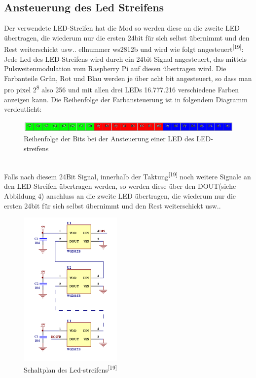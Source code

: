 \documentclass [a4paper, 11pt] {article}
\begin{document}
\subsection{Ansteuerung des Led Streifens}
Der verwendete LED-Streifen hat die Mod so werden diese an die zweite LED übertragen, die wiederum nur die ersten 24bit für sich selbst übernimmt und den Rest weiterschickt usw.. ellnummer ws2812b und wird wie folgt angesteuert\textsuperscript{[19]}:
Jede Led des LED-Streifens wird durch ein 24bit Signal angesteuert, das mittels Pulsweitenmodulation vom Raspberry Pi auf diesen übertragen wird. Die Farbanteile Grün, Rot und Blau werden je über acht bit angesteuert, so dass man pro pixel 2\textsuperscript 8 also 256 und mit allen drei LEDs 16.777.216 verschiedene Farben anzeigen kann. Die Reihenfolge der Farbansteuerung ist in folgendem Diagramm verdeutlicht:
\begin{figure}[h]
	\centering
	\includegraphics[width=17cm]{AufbauDer24BitAnsteuerungDesStreifens.png}
	\caption{Reihenfolge der Bits bei der Ansteuerung einer LED des LED-streifens}
\end{figure}\\
Falls nach diesem 24Bit Signal, innerhalb der Taktung\textsuperscript{[19]} noch weitere Signale an den LED-Streifen übertragen werden, so werden diese über den DOUT(siehe Abbildung 4) anschluss an die zweite LED übertragen, die wiederum nur die ersten 24bit für sich selbst übernimmt und den Rest weiterschickt usw.. 
\begin{figure}[h]
	\centering
	\includegraphics[width=5cm]{Schaltplan_des_LED-Streifens.png}
	\caption{Schaltplan des Led-streifens\textsuperscript{[19]}}
\end{figure}
\end{document}
